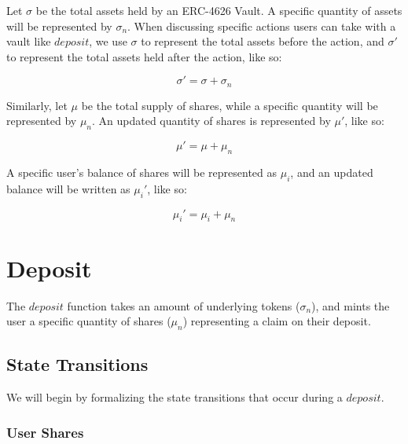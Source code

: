 \documentclass{article}
\begin{document}
Let $\sigma$ be the total assets held by an ERC-4626 Vault. A specific quantity of assets will be represented by $\sigma_n$. When discussing specific actions users can take with a vault like $deposit$, we use $\sigma$ to represent the total assets before the action, and $\sigma'$ to represent the total assets held after the action, like so:

$$ \sigma' = \sigma + \sigma_n $$

Similarly, let $\mu$ be the total supply of shares, while a specific quantity will be represented by $\mu_n$. An updated quantity of shares is represented by $\mu'$, like so:

$$ \mu' = \mu + \mu_n $$

A specific user's balance of shares will be represented as $\mu_i$, and an updated balance will be written as $\mu_i'$, like so:

$$ \mu_i' = \mu_i + \mu_n $$



\section{Deposit}

The $deposit$ function takes an amount of underlying tokens ($
\sigma_n$), and mints the user a specific quantity of shares ($\mu_n$) representing a claim on their deposit.

\subsection{State Transitions}

We will begin by formalizing the state transitions that occur during a $deposit$.

\subsubsection{User Shares}
\end{document}
